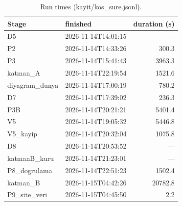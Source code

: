 \begin{table}[ht]
\centering\small
\caption{Run times (kayit/kos_sure.jsonl).}
\label{tab:runtime}
\begin{tabular}{llr}
\hline
Stage & finished & duration (s) \\
\hline
D5 & 2026-11-14T14:01:15 & — \\
P2 & 2026-11-14T14:33:26 & 300.3 \\
P3 & 2026-11-14T15:41:43 & 3963.3 \\
katman\_A & 2026-11-14T22:19:54 & 1521.6 \\
diyagram\_dunya & 2026-11-14T17:00:19 & 780.2 \\
D7 & 2026-11-14T17:39:02 & 236.3 \\
P3B & 2026-11-14T20:21:21 & 5401.4 \\
V5 & 2026-11-14T19:05:32 & 5446.8 \\
V5\_kayip & 2026-11-14T20:32:04 & 1075.8 \\
D8 & 2026-11-14T20:53:52 & — \\
katmanB\_kuru & 2026-11-14T21:23:01 & — \\
P8\_dogrulama & 2026-11-14T22:51:23 & 1502.4 \\
katman\_B & 2026-11-15T04:42:26 & 20782.8 \\
P9\_site\_veri & 2026-11-15T04:45:50 & 2.2 \\
\hline
\end{tabular}
\end{table}